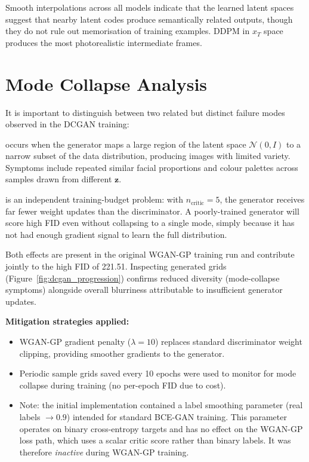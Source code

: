 \documentclass[12pt,a4paper]{article}
\begin{document}
Smooth interpolations across all models indicate that the learned latent spaces
suggest that nearby latent codes produce semantically related outputs, though
they do not rule out memorisation of training examples.
DDPM in $x_T$ space produces the most photorealistic intermediate frames.

\section{Mode Collapse Analysis}
\label{sec:mode_collapse}

It is important to distinguish between two related but distinct failure modes
observed in the DCGAN training:

\begin{description}[noitemsep]
  \item[Mode collapse] occurs when the generator maps a large region of the
        latent space $\mathcal{N}(0,I)$ to a narrow subset of the data
        distribution, producing images with limited variety.  Symptoms include
        repeated similar facial proportions and colour palettes across samples
        drawn from different $\mathbf{z}$.
  \item[Generator starvation] is an independent training-budget problem: with
        $n_{\text{critic}}=5$, the generator receives far fewer weight updates
        than the discriminator.  A poorly-trained generator will score high FID
        even without collapsing to a single mode, simply because it has not had
        enough gradient signal to learn the full distribution.
\end{description}

Both effects are present in the original WGAN-GP training run and contribute
jointly to the high FID of 221.51.  Inspecting generated grids
(Figure~\ref{fig:dcgan_progression}) confirms reduced diversity (mode-collapse
symptoms) alongside overall blurriness attributable to insufficient generator
updates.

\textbf{Mitigation strategies applied:}
\begin{itemize}[noitemsep]
  \item WGAN-GP gradient penalty ($\lambda=10$) replaces standard discriminator
        weight clipping, providing smoother gradients to the generator.
  \item Periodic sample grids saved every 10 epochs were used to monitor for
        mode collapse during training (no per-epoch FID due to cost).
  \item Note: the initial implementation contained a label smoothing parameter
        (real labels $\rightarrow 0.9$) intended for standard BCE-GAN training.
        This parameter operates on binary cross-entropy targets and has no effect
        on the WGAN-GP loss path, which uses a scalar critic score rather than
        binary labels.  It was therefore \emph{inactive} during WGAN-GP training.
\end{itemize}
\end{document}
